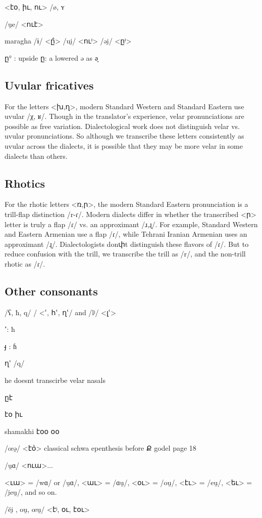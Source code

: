 <էօ, իւ, ու> /ø, ʏ

/u̯e/ <ուէ>

maragha
/ɨ/ <ը̂>  
/ui̯/ <ուⁱ>
/əi̯/ <ըⁱ>  


ը° : upside ը: a lowered ə as ə̞
\subsection{Uvular fricatives}
For the letters <խ,ղ>, modern Standard Western and Standard Eastern use uvular /χ, ʁ/. Though in the translator's experience, velar pronunciations are possible as free variation. Dialectological work does not distinguish velar vs. uvular pronunciations. So although we transcribe these letters consistently as uvular across the dialects, it is possible that they may be more velar in some dialects than others. 

\subsection{Rhotics}
For the rhotic letters <ռ,ր>, the modern Standard Eastern pronunciation is a trill-flap distinction /r-ɾ/. Modern dialects differ in whether the transcribed <ր>  letter is truly a flap /ɾ/ vs. an approximant /ɹ,ɻ/. For example, Standard Western and Eastern Armenian use a flap /ɾ/, while Tehrani Iranian Armenian uses an approximant /ɻ/.  Dialectologists donփt distinguish these flavors of /ɾ/. But to reduce confusion with the trill, we transcribe the trill as /r/, and the non-trill rhotic as /ɾ/. 

\subsection{Other consonants}
/ʕ, ħ, q/ /   <ՙ, հՙ, ղՙ/   and /lʲ/  <լՙ> 

՚: ħ  

յ̵   : ɦ

ղՙ /q/

he doesnt transcirbe velar nasals

ըէ

էօ իւ

shamakhi
էօօ
օօ

/œə̯/ <է\`օ>
classical schwa epenthesis before Ք godel page 18

/u̯ɑ/ <ուա>... 

<ւա> = /wɑ/ or /u̯ɑ/, <աւ> = /ɑu̯/, <օւ> = /ou̯/, <էւ> = /eu̯/, <եւ> = /i̯eu̯/, and so on. 

/ĕi̯     ,  ou̯, œu̯/  <էʲ,  օւ, էօւ>

